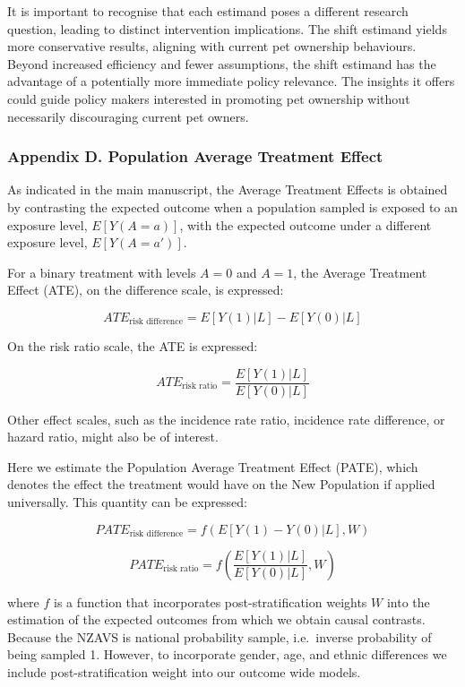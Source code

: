 \documentclass[
  singlecolumn,
  9pt]{article}
\begin{document}
It is important to recognise that each estimand poses a different
research question, leading to distinct intervention implications. The
shift estimand yields more conservative results, aligning with current
pet ownership behaviours. Beyond increased efficiency and fewer
assumptions, the shift estimand has the advantage of a potentially more
immediate policy relevance. The insights it offers could guide policy
makers interested in promoting pet ownership without necessarily
discouraging current pet owners.

\newpage{}

\subsubsection{Appendix D. Population Average Treatment
Effect}\label{appendix-d.-population-average-treatment-effect}

As indicated in the main manuscript, the Average Treatment Effects is
obtained by contrasting the expected outcome when a population sampled
is exposed to an exposure level, \(E[Y(A = a)]\), with the expected
outcome under a different exposure level, \(E[Y(A=a')]\).

For a binary treatment with levels \(A=0\) and \(A=1\), the Average
Treatment Effect (ATE), on the difference scale, is expressed:

\[ATE_{\text{risk difference}} = E[Y(1)|L] - E[Y(0)|L]\]

On the risk ratio scale, the ATE is expressed:

\[ATE_{\text{risk ratio}} = \frac{E[Y(1)|L]}{E[Y(0)|L]}\]

Other effect scales, such as the incidence rate ratio, incidence rate
difference, or hazard ratio, might also be of interest.

Here we estimate the Population Average Treatment Effect (PATE), which
denotes the effect the treatment would have on the New Population if
applied universally. This quantity can be expressed:

\[PATE_{\text{risk difference}} = f(E[Y(1) - Y(0)|L], W)\]

\[PATE_{\text{risk ratio}} = f\left(\frac{E[Y(1)|L]}{E[Y(0)|L]}, W\right)\]

where \(f\) is a function that incorporates post-stratification weights
\(W\) into the estimation of the expected outcomes from which we obtain
causal contrasts. Because the NZAVS is national probability sample,
i.e.~inverse probability of being sampled 1. However, to incorporate
gender, age, and ethnic differences we include post-stratification
weight into our outcome wide models.
\end{document}
